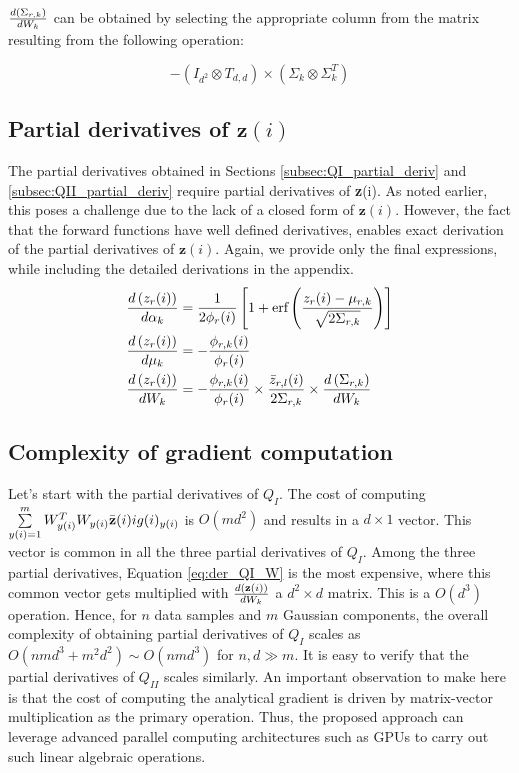 \documentclass[]{article}
\begin{document}
$\der{W_k}{\Sigma_{r,k}}$ can be obtained by selecting the appropriate column from the matrix resulting from the following operation:

\begin{equation}
-(I_{d^2} \otimes T_{d,d})\times(\Sigma_k \otimes \Sigma_k^T)
\end{equation}

\subsection{Partial derivatives of $\textbf{z}(i)$}
The partial derivatives obtained in Sections \ref{subsec:QI_partial_deriv} and \ref{subsec:QII_partial_deriv} require partial derivatives of \textbf{z}(i). As noted earlier, this poses a challenge due to the lack of a closed form of $\textbf{z}(i)$. However, the fact that the forward functions have well defined derivatives, enables exact derivation of the partial derivatives of $\textbf{z}(i)$. Again, we provide only the final expressions, while including the detailed derivations in the appendix.
\begin{align}\label{eq:der_z}
\der{\alpha_k}{z_r(i)} &= \frac{1}{2\phi_r(i)}\left[1+ \erf \left( \frac{z_r(i)-\mu_{r,k}}{\sqrt{2\Sigma_{r,k}}}\right) \right] \\
\der{\mu_k}{z_r(i)} &= -\frac{\phi_{r,k}(i)}{\phi_r(i)} \\
\der{W_k}{z_r(i)} &= -\frac{\phi_{r,k}(i)}{\phi_r(i)}  \times \frac{\bar{z}_{r,l}(i)}{2\Sigma_{r,k}} \times \der{W_k}{\Sigma_{r,k}} 
\end{align}
\subsection{Complexity of gradient computation}\label{subsec:complexity_analytic_grad}
Let's start with the partial derivatives of $Q_I$. The cost of computing $\sum\limits_{y(i)=1}^m  W^T_{y(i)}  W_{y(i)} \zbar{i}{i} g(i)_{y(i)}$ is $O(md^2)$ and results in a  $d\times 1$ vector. This vector is common in all the three partial derivatives of $Q_I$. Among the three partial derivatives, Equation \ref{eq:der_QI_W} is the most expensive, where this common vector gets multiplied with $\der{W_k}{\textbf{z}(i)}$ a $d^2\times d$ matrix. This is a $O(d^3)$ operation. Hence, for $n$ data samples and $m$ Gaussian components, the overall complexity of obtaining partial derivatives of $Q_I$ scales as $O(nmd^3+m^2d^2) \sim O(nmd^3)$ for $n,d \gg m$. It is easy to verify that the partial derivatives of $Q_{II}$ scales similarly. An important observation to make here is that the cost of computing the analytical gradient is driven by matrix-vector multiplication as the primary operation. Thus, the proposed approach can leverage advanced parallel computing architectures such as GPUs to carry out such linear algebraic operations.  
\end{document}
